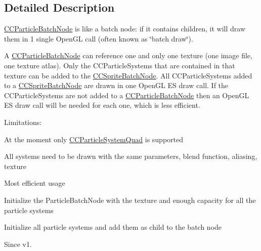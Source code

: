 \subsection{Detailed Description}
\hyperlink{interface_c_c_particle_batch_node}{C\-C\-Particle\-Batch\-Node} is like a batch node\-: if it contains children, it will draw them in 1 single Open\-G\-L call (often known as \char`\"{}batch draw\char`\"{}).

A \hyperlink{interface_c_c_particle_batch_node}{C\-C\-Particle\-Batch\-Node} can reference one and only one texture (one image file, one texture atlas). Only the C\-C\-Particle\-Systems that are contained in that texture can be added to the \hyperlink{interface_c_c_sprite_batch_node}{C\-C\-Sprite\-Batch\-Node}. All C\-C\-Particle\-Systems added to a \hyperlink{interface_c_c_sprite_batch_node}{C\-C\-Sprite\-Batch\-Node} are drawn in one Open\-G\-L E\-S draw call. If the C\-C\-Particle\-Systems are not added to a \hyperlink{interface_c_c_particle_batch_node}{C\-C\-Particle\-Batch\-Node} then an Open\-G\-L E\-S draw call will be needed for each one, which is less efficient.

Limitations\-:
\begin{DoxyItemize}
\item At the moment only \hyperlink{interface_c_c_particle_system_quad}{C\-C\-Particle\-System\-Quad} is supported
\item All systems need to be drawn with the same parameters, blend function, aliasing, texture
\end{DoxyItemize}

Most efficient usage
\begin{DoxyItemize}
\item Initialize the Particle\-Batch\-Node with the texture and enough capacity for all the particle systems
\item Initialize all particle systems and add them as child to the batch node \begin{DoxySince}{Since}
v1. 
\end{DoxySince}

\end{DoxyItemize}

